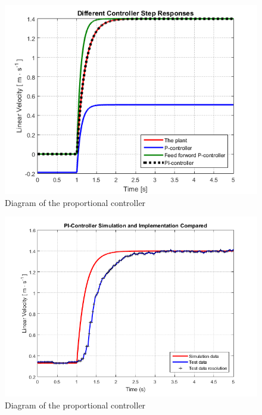 \begin{figure}[H]
 	\centering
 	\includegraphics[scale=0.4]{figures/ControllerSteps}
 	\caption{Diagram of the proportional controller}
 	\label{fig:ControllerSteps}
 \end{figure}

\begin{figure}[H]
 	\centering
 	\includegraphics[scale=0.4]{figures/PIcontrollerStepRealVsSim}
 	\caption{Diagram of the proportional controller}
 	\label{fig:PIcontrollerStepRealVsSim}
 \end{figure}





